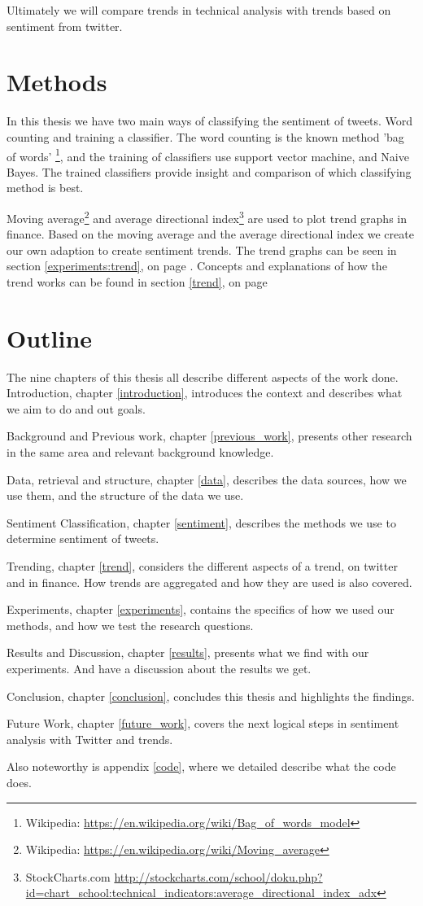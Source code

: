 Ultimately we will compare trends in technical analysis with trends based on
sentiment from twitter. 

\section{Methods}

In this thesis we have two main ways of classifying the sentiment of tweets.
Word counting and training a classifier. The word counting is the known method
'bag of words'
\footnote{Wikipedia: \url{https://en.wikipedia.org/wiki/Bag_of_words_model}},
and the training of classifiers use support vector machine, and Naive Bayes.
The trained classifiers provide insight and comparison of which classifying
method is best.  

Moving average\footnote{Wikipedia:
\url{https://en.wikipedia.org/wiki/Moving_average}} and average directional
index\footnote{StockCharts.com
\url{http://stockcharts.com/school/doku.php?id=chart_school:technical_indicators:average_directional_index_adx}}
are used to plot trend graphs in finance.
Based on the moving average and the average directional index we create our own
adaption to create sentiment trends.  
The trend graphs can be seen in section
\ref{experiments:trend}, on page \pageref{experiments:trend}. Concepts and
explanations of how the trend works can be found in section \ref{trend}, on page \pageref{trend}

\section{Outline}
The nine chapters of this thesis all describe different aspects of the work
done. 
Introduction, chapter \ref{introduction}, introduces the context and describes
what we aim to do and out goals. 

Background and Previous work, chapter \ref{previous_work}, presents other
research in the same area and relevant background knowledge. 

Data, retrieval and structure, chapter \ref{data}, describes the data sources,
how we use them, and the structure of the data we use. 

Sentiment Classification, chapter \ref{sentiment}, describes the methods we use
to determine sentiment of tweets.  

Trending, chapter \ref{trend}, considers the different aspects of a trend, on
twitter and in finance. How trends are aggregated and how they are used is also
covered.  

Experiments, chapter \ref{experiments}, contains the specifics of how we used
our methods, and how we test the research questions.

Results and Discussion, chapter \ref{results}, presents what we find with our
experiments. And have a discussion about the results we get.   

Conclusion, chapter \ref{conclusion}, concludes this thesis and highlights the
findings.  

Future Work, chapter \ref{future_work}, covers the next logical steps in
sentiment analysis with Twitter and trends.  

Also noteworthy is appendix \ref{code}, where we detailed describe what the
code does.  
%
